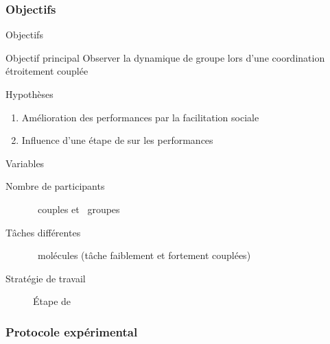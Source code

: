 \documentclass[english,french,dvips,10pt]{mybeamer}
\begin{document}
	\subsubsection{Objectifs}
	\begin{myframe}{Objectifs}
		\begin{myblock}{Objectif principal}
			Observer la dynamique de groupe lors d'une coordination étroitement couplée
		\end{myblock}
		\begin{myplusblock}{Hypothèses}
			\begin{enumerate}
				\item Amélioration des performances par la facilitation sociale
				\item Influence d'une étape de \mybrainstorming sur les performances 
			\end{enumerate}
		\end{myplusblock}
		\begin{myblock}{Variables}
			\begin{description}
				\item[Nombre de participants] ~couples et ~groupes
				\item[Tâches différentes] ~molécules (tâche faiblement et fortement couplées)
				\item[Stratégie de travail] Étape de \mybrainstorming
			\end{description}
		\end{myblock}
	\end{myframe}
	\subsubsection{Protocole expérimental}
\end{document}
